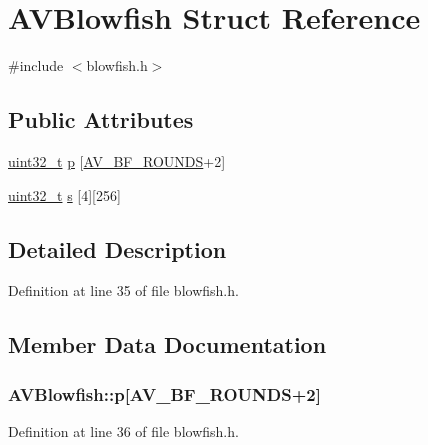 \hypertarget{struct_a_v_blowfish}{}\section{A\+V\+Blowfish Struct Reference}
\label{struct_a_v_blowfish}


{\ttfamily \#include $<$blowfish.\+h$>$}

\subsection*{Public Attributes}
\begin{DoxyCompactItemize}
\item 
\hyperlink{lib-src_2ffmpeg_2win32_2stdint_8h_a6eb1e68cc391dd753bc8ce896dbb8315}{uint32\+\_\+t} \hyperlink{struct_a_v_blowfish_a8ceacf7fa493d6822c08aa465462606f}{p} \mbox{[}\hyperlink{group__lavu__blowfish_ga9ed9747b44cc2737a74a37f80e5cc269}{A\+V\+\_\+\+B\+F\+\_\+\+R\+O\+U\+N\+DS}+2\mbox{]}
\item 
\hyperlink{lib-src_2ffmpeg_2win32_2stdint_8h_a6eb1e68cc391dd753bc8ce896dbb8315}{uint32\+\_\+t} \hyperlink{struct_a_v_blowfish_abf6f8773f7f25b320439df6a75cd909c}{s} \mbox{[}4\mbox{]}\mbox{[}256\mbox{]}
\end{DoxyCompactItemize}


\subsection{Detailed Description}


Definition at line 35 of file blowfish.\+h.



\subsection{Member Data Documentation}
\subsubsection[{\texorpdfstring{p}{p}}]{ A\+V\+Blowfish\+::p\mbox{[}{\bf A\+V\+\_\+\+B\+F\+\_\+\+R\+O\+U\+N\+DS}+2\mbox{]}}\hypertarget{struct_a_v_blowfish_a8ceacf7fa493d6822c08aa465462606f}{}\label{struct_a_v_blowfish_a8ceacf7fa493d6822c08aa465462606f}


Definition at line 36 of file blowfish.\+h.

